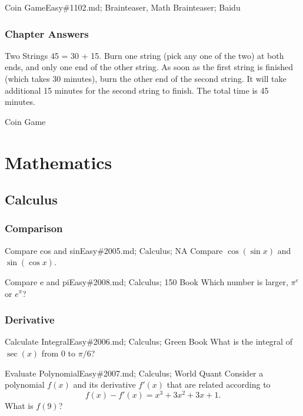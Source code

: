 \documentclass[oldfontcommands]{memoir}
\begin{document}
{\begin{question}{Coin Game}{Easy}{\#1102.md; Brainteaser, Math Brainteaser; Baidu}
\end{question}

\newpage\section{Chapter Answers}\begin{answer}{Two Strings}
45 = 30 + 15. Burn one string (pick any one of the two) at both ends, and only one end of the other string. As soon as the first string is finished (which takes 30 minutes), burn the other end of the second string. It will take additional 15 minutes for the second string to finish. The total time is 45 minutes.\end{answer}
\begin{answer}{Coin Game}
\end{answer}
\part{Mathematics}
\chapter{Calculus}
\minitoc
\section{Comparison}
\begin{question}{Compare cos and sin}{Easy}{\#2005.md; Calculus; NA}
Compare $\cos(\sin x)$ and $\sin(\cos x)$.

\end{question}

\begin{question}{Compare e and pi}{Easy}{\#2008.md; Calculus; 150 Book}
Which number is larger, $\pi^e$ or $e^\pi$?

\end{question}

\section{Derivative}
\begin{question}{Calculate Integral}{Easy}{\#2006.md; Calculus; Green Book}
What is the integral of $\sec(x)$ from 0 to $\pi/6$?

\end{question}

\begin{question}{Evaluate Polynomial}{Easy}{\#2007.md; Calculus; World Quant}
Consider a polynomial $f(x)$ and its derivative $f'(x)$ that are related according to $$f(x) - f'(x) = x^3 + 3x^2 + 3x + 1.$$  What is $f(9)$?


\end{question}}
\end{document}

